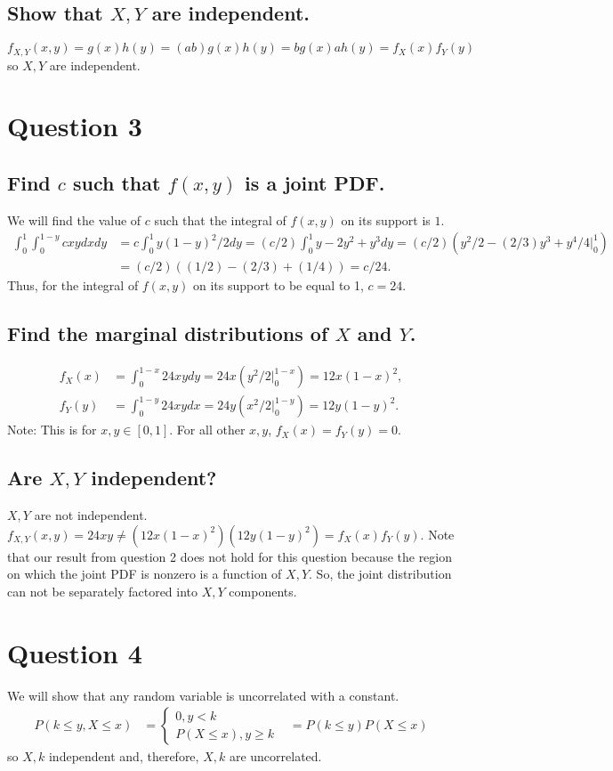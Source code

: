 \documentclass[11pt]{article} %
\begin{document}
\subsection{Show that $X,Y$ are independent.}
$f_{X,Y}(x,y) = g(x)h(y) =(ab)g(x)h(y) =  bg(x)ah(y) = f_X(x)f_Y(y)$ so $X,Y$ are independent.
\section{Question 3}
\subsection{Find $c$ such that $f(x,y)$ is a joint PDF.}
We will find the value of $c$ such that the integral of $f(x,y)$ on its support is $1$.
\begin{align*}
\int_{0}^{1}\int_{0}^{1 - y} cxy dxdy &= c\int_{0}^{1}y(1-y)^2/2 dy = (c/2)\int_{0}^{1}y-2y^2 +y^3 dy = (c/2)(y^2/2 - (2/3)y^3 + y^4/4|_{0}^{1})\\
&= (c/2)((1/2) - (2/3) + (1/4) ) = c/24.
\end{align*}
Thus, for the integral of $f(x,y)$ on its support to be equal to 1, $c = 24.$

\subsection{Find the marginal distributions of $X$ and $Y$.}
\begin{align*}
f_X(x) &= \int_{0}^{1-x}24xy dy = 24x(y^2/2|_{0}^{1-x}) = 12x(1-x)^2,\\
f_Y(y) &= \int_{0}^{1-y}24xy dx = 24y(x^2/2|_{0}^{1-y}) = 12y(1-y)^2.
\end{align*}
Note: This is for $x,y \in [0,1].$ For all other $x,y$, $f_X(x) = f_Y(y) = 0.$
\subsection{Are $X,Y$ independent?}
$X,Y$ are not independent. $f_{X,Y}(x,y) = 24xy \neq  (12x(1-x)^2)  (12y(1-y)^2) = f_X(x)f_Y(y).$ Note that our result from question 2 does not hold for this question because the region on which the joint PDF is nonzero is a function of $X,Y$. So, the joint distribution can not be separately factored into $X,Y$ components.
\section{Question 4}
We will show that any random variable is uncorrelated with a constant. 
\begin{align*}
P(k \leq y,X \leq x) &= \begin{cases} 0, y<k \\ P(X \leq x), y\geq k
\end{cases}
&= P(k \leq y)P(X \leq x)
\end{align*} so $X,k$ independent and, therefore, $X,k$ are uncorrelated.
\end{document}
